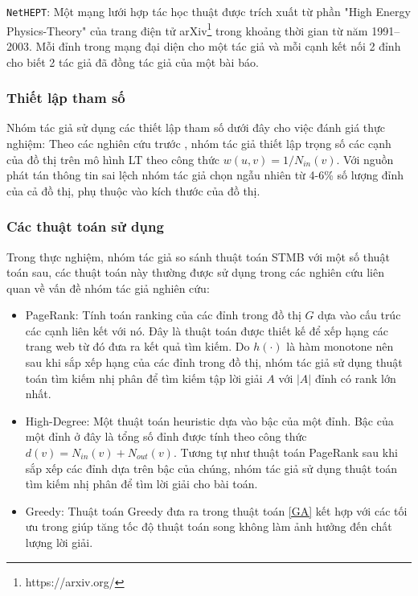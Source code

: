 \texttt{NetHEPT}\cite{kemple1, chen10LT}: Một mạng lưới hợp tác học thuật được trích xuất từ phần "High Energy Physics-Theory" của trang điện tử arXiv\footnote{https://arxiv.org/} trong khoảng thời gian từ năm 1991--2003. Mỗi đỉnh trong mạng đại diện cho một tác giả và mỗi cạnh kết nối 2 đỉnh cho biết 2 tác giả đã đồng tác giả của một bài báo.

\subsubsection{Thiết lập tham số}
Nhóm tác giả sử dụng các thiết lập tham số dưới đây cho việc đánh giá thực nghiệm:
Theo các nghiên cứu trước \cite{khali, kemple1,chen10LT}, nhóm tác giả thiết lập trọng số các cạnh của đồ thị trên mô hình LT theo công thức $w(u,v) = 1/N_{in}(v)$. Với nguồn phát tán thông tin sai lệch nhóm tác giả chọn ngẫu nhiên từ 4-6\% số lượng đỉnh của cả đồ thị, phụ thuộc vào kích thước của đồ thị. 


\subsubsection{Các thuật toán sử dụng}
Trong thực nghiệm, nhóm tác giả so sánh thuật toán STMB với một số thuật toán sau, các thuật toán này thường được sử dụng trong các nghiên cứu liên quan về vấn đề nhóm tác giả nghiên cứu:
\begin {itemize}
\item PageRank: Tính toán ranking của các đỉnh trong đồ thị $G$ dựa vào cấu trúc các cạnh liên kết với nó. Đây là thuật toán được thiết kế để xếp hạng các trang web từ đó đưa ra kết quả tìm kiếm. Do $h(\cdot)$ là hàm monotone nên sau khi sắp xếp hạng của các đỉnh trong đồ thị, nhóm tác giả sử dụng thuật toán tìm kiếm nhị phân để tìm kiếm tập lời giải $A$ với $|A|$ đỉnh có rank lớn nhất.
\item High-Degree: Một thuật toán heuristic dựa vào bậc của một đỉnh. Bậc của một đỉnh ở đây là tổng số đỉnh được tính theo công thức $d(v) = N_{in}(v) + N_{out}(v)$. Tương tự như thuật toán PageRank sau khi sắp xếp các đỉnh dựa trên bậc của chúng, nhóm tác giả sử dụng thuật toán tìm kiếm nhị phân để tìm lời giải cho bài toán.
\item Greedy: Thuật toán Greedy đưa ra trong thuật toán \ref{GA} kết hợp với các tối ưu trong \cite{Jleskovec} giúp tăng tốc độ thuật toán song không làm ảnh hưởng đến chất lượng lời giải.
\end{itemize} 

